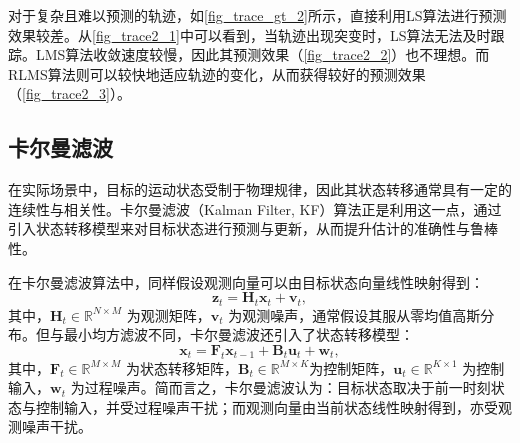 \begin{solution}
    对于复杂且难以预测的轨迹，如\cref{fig_trace_gt_2}所示，直接利用LS算法进行预测效果较差。从\cref{fig_trace2_1}中可以看到，当轨迹出现突变时，LS算法无法及时跟踪。LMS算法收敛速度较慢，因此其预测效果（\cref{fig_trace2_2}）也不理想。而RLMS算法则可以较快地适应轨迹的变化，从而获得较好的预测效果（\cref{fig_trace2_3}）。
\end{solution}

\subsection{卡尔曼滤波}
在实际场景中，目标的运动状态受制于物理规律，因此其状态转移通常具有一定的连续性与相关性。卡尔曼滤波（Kalman Filter, KF）算法正是利用这一点，通过引入状态转移模型来对目标状态进行预测与更新，从而提升估计的准确性与鲁棒性。

在卡尔曼滤波算法中，同样假设观测向量可以由目标状态向量线性映射得到：
\[
    \bm{z}_t = \mathbf{H}_t \bm{x}_t + \bm{v}_t,
\]
其中，$\mathbf{H}_t \in \mathbb{R}^{N \times M}$ 为观测矩阵，\( \bm{v}_t \) 为观测噪声，通常假设其服从零均值高斯分布。但与最小均方滤波不同，卡尔曼滤波还引入了状态转移模型：
\[
    \bm{x}_t = \mathbf{F}_t \bm{x}_{t-1} + \mathbf{B}_t  \bm{u}_t + \bm{w}_t,
\]
其中，$\mathbf{F}_t \in \mathbb{R}^{M \times M}$ 为状态转移矩阵，\( \mathbf{B}_t \in \mathbb{R}^{M \times K} \)为控制矩阵，\( \bm{u}_t \in \mathbb{R}^{K \times 1} \) 为控制输入，$\bm{w}_t$ 为过程噪声。简而言之，卡尔曼滤波认为：目标状态取决于前一时刻状态与控制输入，并受过程噪声干扰；而观测向量由当前状态线性映射得到，亦受观测噪声干扰。

